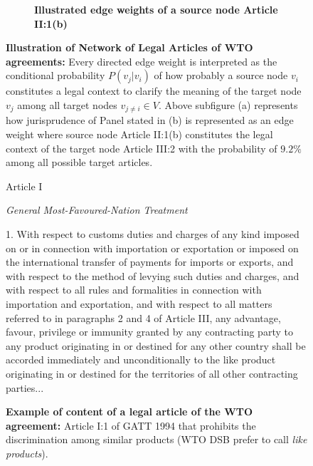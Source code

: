 \begin{figure}[]
    \begin{subfigure}[b]{1\textwidth}
        \centering{
            
        }
        \caption{\textbf{Illustrated edge weights of a source node Article II:1(b)}}
        \label{subfig:a:art2b}
    \end{subfigure}
    \vfill
    \begin{subfigure}[b]{1\textwidth}
    \end{subfigure}
    \caption{\textbf{Illustration of Network of Legal Articles of WTO agreements: }Every directed edge weight is interpreted as the conditional probability $P(v_j|v_i)$ of how probably a source node $v_i$ constitutes a legal context to clarify the meaning of the target node $v_j$ among all target nodes $v_{j \neq i} \in V$. Above subfigure (a) represents how jurisprudence of Panel stated in (b) is represented as an edge weight where source node Article II:1(b) constitutes the legal context of the target node Article III:2 with the probability of $9.2\%$ among all possible target articles.}
    \label{fig:def-example}
\end{figure}



\begin{figure}[h]
    \begin{center}
        Article I
    \end{center}
    \begin{center}
        \textit{General Most-Favoured-Nation Treatment}
    \end{center}
    1. With respect to customs duties and charges of any kind imposed on or in connection
    with importation or exportation or imposed on the international transfer of payments for
    imports or exports, and with respect to the method of levying such duties and charges, and
    with respect to all rules and formalities in connection with importation and exportation, and
    with respect to all matters referred to in paragraphs 2 and 4 of Article III, any advantage,
    favour, privilege or immunity granted by any contracting party to any product originating in
    or destined for any other country shall be accorded immediately and unconditionally to the
    like product originating in or destined for the territories of all other contracting parties...
    \caption{\textbf{Example of content of a legal article of the WTO agreement:} Article I:1 of GATT 1994 that prohibits the discrimination among similar products (WTO DSB prefer to call \textit{like products}).}
    \label{fig:gatt_art1}
\end{figure}



